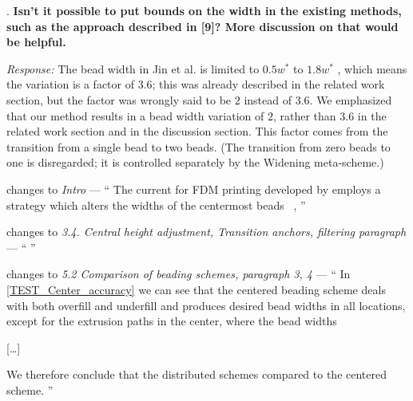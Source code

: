 \documentclass[5p,10pt,times]{elsarticle}
\theoremstyle{definition}
\newcommand{\revise}[2]{{\color{red}{#1}\color{blue}{#2}}}
\newcommand{\commits}[1]{{\bf\begin{alltt} {#1}\end{alltt}}}
\renewcommand{\commits}[1]{}
\newcommand\paper[2]{\par changes to \emph{#1} --- ``#2'' }
\newcommand\Que[1]{%
   \leavevmode\par
   \refstepcounter{question}
   \noindent
   \thequestion. {\bf#1}\par}
\newcounter{question}
\numberwithin{question}{section}
\newcommand\Ans[2][]{%
    \leavevmode\par\noindent
   {%
    {\it Response:} \textbf{#1}#2\par}}
\begin{document}
\Que{
Isn’t it possible to put bounds on the width in the existing methods, such as the approach described in [9]? More discussion on that would be helpful. 
}
\Ans{
The bead width in Jin et al. is limited to $0.5 w^*$ to $1.8 w^*$ , which means the variation is a factor of $3.6$;
this was already described in the related work section, but the factor was wrongly said to be $2$ instead of $3.6$.
We emphasized that our method results in a bead width variation of $2$, rather than $3.6$ in the related work section and in the discussion section.
This factor comes from the transition from a single bead to two beads.
(The transition from zero beads to one is disregarded; it is controlled separately by the Widening meta-scheme.)
}
\commits{
661d8f6766548c287cb174070432097e396d198f 
92217c04e118dcf6f65b16a1ffcdfa40b4d50c0d give bounds on width variation (reviewer 3.4)
2f230ea9f26f9870027e80db89eae8774f19d339 fix bounds of width variation in Jin (reviewer 3.4)
acf8bbed0e530a3038d6fea064c33e7df6f0f933 %
}
\paper{Intro}{
The current \revise{state-of-the-art}{state of the art} for FDM printing developed by \citeauthor{Jin2017JMS} employs a strategy which alters the widths of the centermost beads \revise{at most by a factor of $2$}{within a range of widths with a factor of $3.6$}~\cite{Jin2017JMS},
}
\paper{3.4. Central height adjustment, Transition anchors, filtering paragraph}
{
\revise{}{This means that for some small regions we generate toolpaths with bead widths outside the typical range.}
}
\paper{5.2 Comparison of beading schemes, paragraph 3, 4}{
In \cref{TEST_Center_accuracy} we can see that
the centered beading scheme \revise{effectively }{}deals with both overfill and underfill and produces desired bead widths in all locations, except for the extrusion paths in the center, where the bead widths \revise{are within a factor 2 off from the desired bead width.}{range between $0.5 w^*$ and $1.8w^*$, i.e. the variation is within a factor of $3.6$.}

[\dots]

\revise{}{Moreover, because the quantization operator rounds to the nearest number of beads, in the worst case where we switch from a single to two beads the widths switch from $0.75w^*$ to $1.5w^*$, i.e. the variation is within a factor $2$, which is considerably lower the than factor of $3.6$ in the centered scheme.}
We therefore conclude that the distributed schemes \revise{result in bead widths closer to the preferred widths}{exhibit a lower bead width variation} compared to the centered scheme.
}
\end{document}
